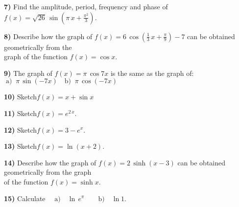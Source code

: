 \documentclass[11pt]{article}
\begin{document}
\textbf{7)} Find the amplitude, period, frequency and phase of
$ f(x) = \sqrt{26} \, \sin(\pi \, x + \frac{\pi^2}{3})$.

\textbf{8)} Describe how the graph of
 $f(x) = 6 \, \cos(\frac{1}{3}\,x + \frac{\pi}{9}) - 7$ can be obtained geometrically from the \\
 \hspace*{4mm} graph of the function $f(x) = \cos x$.

\textbf{9)} The graph of $f(x) = \pi \, \cos 7x$ is the same as the
graph of: $\; \mbox{a)}\;\; \pi\, \sin(-7x)  \quad  \mbox{b)} \;\; \pi \, \cos (-7x)$

\textbf{10)} Sketch\hspace*{1cm}$ f(x) = x + \sin x$

\textbf{11)} Sketch\hspace*{1cm}$ f(x) = e^{2\,x}$.

\textbf{12)} Sketch\hspace*{1cm}$ f(x) = 3 - e^x$.

\textbf{13)} Sketch\hspace*{1cm}$ f(x) = \ln(x + 2)$.

\textbf{14)} Describe how the graph of
$f(x) = 2 \, \sinh(x - 3)$ can be obtained geometrically from the graph \\
\hspace*{7mm} of the function $f(x) = \sinh x$.

\textbf{15) }Calculate $\quad \mbox{a)} \quad \ln \, e^{\pi} \qquad
\mbox{b)}\quad \ln 1$.
\end{document}
